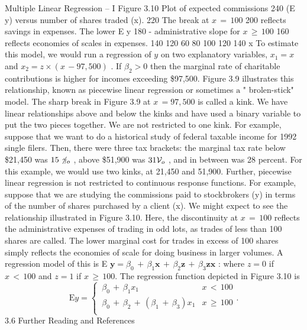 \documentclass[11pt]{article}
\begin{document}
 Multiple Linear Regression -- I
Figure 3.10 Plot of
expected commissions 240
(E y) versus number
of shares traded (x). 220
 The break at \(x \,=\, 1 0 0\) 200
reflects savings in
expenses. The lower E y 180 -
administrative
 slope for \(x \, \geq\, 1 0 0\) 160
reflects economies of
 scales in expenses. 140
120
60 80 100 120 140
x
To estimate this model, we would run a regression of \(y\) on two explanatory
variables, \(x_{1}=x\) and \(x_{2}=z \times( x \,-9 7 , 5 0 0 )\) . If \(\beta_{2} > 0\) then the marginal rate
 of charitable contributions is higher for incomes exceeding \$97,500.
Figure 3.9 illustrates this relationship, known as piecewise linear regression or
sometimes \(\mathrm{a}\) " brolen-stick" model. The sharp break in Figure 3.9 at \(x \,=9 7 , \! 5 0 0\)
 is called a kink. We have linear relationships above and below the kinks and have
used a binary variable to put the two pieces together. We are not restricted to one
 kink. For example, suppose that we want to do a historical study of federal taxable
income for 1992 single filers. Then, there were three tax brackets: the marginal
tax rate below \$21,450 was \(1 5 \not\! \gamma_{o}\) , above \$51,900 was \(3 1 {\cal V}_{o}\) , and in between was
28 percent. For this example, we would use two kinks, at 21,450 and 51,900.
Further, piecewise linear regression is not restricted to continuous response
functions. For example, suppose that we are studying the commissions paid to
stockbrokers (y) in terms of the number of shares purchased by a client (x).
We might expect to see the relationship illustrated in Figure 3.10. Here, the
discontinuity at \(x \,=\, 1 0 0\) reflects the administrative expenses of trading in odd
 lots, as trades of less than 100 shares are called. The lower marginal cost for trades
 in excess of 100 shares simply reflects the economies of scale for doing business
 in larger volumes. A regression model of this is E \(\boldsymbol{y}=\beta_{0} \,+\, \beta_{1} \boldsymbol{x} \,+\, \beta_{2} \boldsymbol{z} \,+\, \beta_{3} \boldsymbol{z} \boldsymbol{x}\) :
where \(z=0\) if \(x \, < \, 1 0 0\) and \(z=1\) if \(x \, \geq\, 1 0 0 .\) The regression function depicted
in Figure 3.10 is
\[
\textrm{E} y=\begin{cases} {\, \beta_{0} \,+\, \beta_{1} x_{1}} & {x \, < \, 1 0 0} \\ {\, \beta_{0} \,+\, \beta_{2} \,+\, ( \beta_{1} \,+\, \beta_{3} ) x_{1}} & {x \, \geq\, 1 0 0} \\ \end{cases} .
\]
3.6 Further Reading and References
\end{document}
